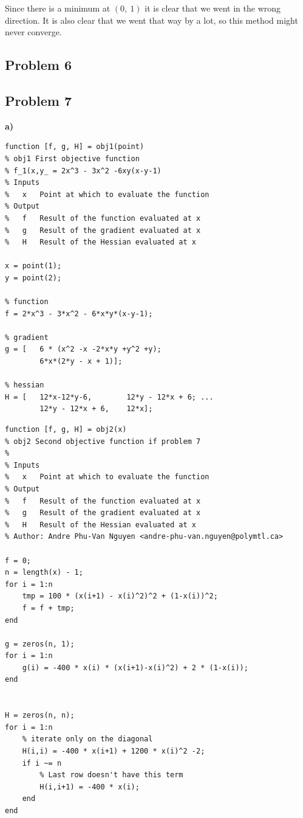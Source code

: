 Since there is a minimum at $(0,\ 1)$ it is clear that we went in the wrong direction. It is also clear that we went that way by a lot, so this method might never converge.

\subsection{Problem 6}

\incomplete

\subsection{Problem 7}

\textbf{a)}

\begin{lstlisting}[style=Matlab-editor]
function [f, g, H] = obj1(point)
% obj1 First objective function
% f_1(x,y_ = 2x^3 - 3x^2 -6xy(x-y-1)
% Inputs
%   x   Point at which to evaluate the function
% Output
%   f   Result of the function evaluated at x
%   g   Result of the gradient evaluated at x
%   H   Result of the Hessian evaluated at x

x = point(1);
y = point(2);

% function
f = 2*x^3 - 3*x^2 - 6*x*y*(x-y-1);

% gradient
g = [   6 * (x^2 -x -2*x*y +y^2 +y);
        6*x*(2*y - x + 1)];

% hessian
H = [   12*x-12*y-6,        12*y - 12*x + 6; ...
        12*y - 12*x + 6,    12*x];

\end{lstlisting}


\begin{lstlisting}[style=Matlab-editor]
function [f, g, H] = obj2(x)
% obj2 Second objective function if problem 7
%   
% Inputs
%   x   Point at which to evaluate the function
% Output 
%   f   Result of the function evaluated at x
%   g   Result of the gradient evaluated at x
%   H   Result of the Hessian evaluated at x
% Author: Andre Phu-Van Nguyen <andre-phu-van.nguyen@polymtl.ca>

f = 0;
n = length(x) - 1;
for i = 1:n
    tmp = 100 * (x(i+1) - x(i)^2)^2 + (1-x(i))^2;
    f = f + tmp;
end

g = zeros(n, 1);
for i = 1:n
    g(i) = -400 * x(i) * (x(i+1)-x(i)^2) + 2 * (1-x(i));
end


H = zeros(n, n);
for i = 1:n
    % iterate only on the diagonal
    H(i,i) = -400 * x(i+1) + 1200 * x(i)^2 -2;
    if i ~= n
        % Last row doesn't have this term
        H(i,i+1) = -400 * x(i);
    end        
end
\end{lstlisting}

